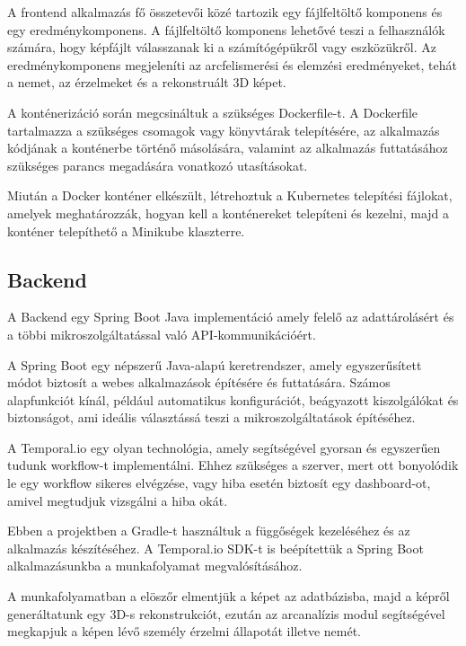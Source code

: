 \documentclass[12pt,a4]{article}
\begin{document}
            A frontend alkalmazás fő összetevői közé tartozik egy fájlfeltöltő komponens és egy eredménykomponens. A fájlfeltöltő komponens lehetővé teszi a felhasználók számára, hogy képfájlt válasszanak ki a számítógépükről vagy eszközükről. Az eredménykomponens megjeleníti az arcfelismerési és elemzési eredményeket, tehát a nemet, az érzelmeket és a rekonstruált 3D képet.

            A konténerizáció során megcsináltuk a szükséges Dockerfile-t. A Dockerfile tartalmazza a szükséges csomagok vagy könyvtárak telepítésére, az alkalmazás kódjának a konténerbe történő másolására, valamint az alkalmazás futtatásához szükséges parancs megadására vonatkozó utasításokat. 

            Miután a Docker konténer elkészült, létrehoztuk a Kubernetes telepítési fájlokat, amelyek meghatározzák, hogyan kell a konténereket telepíteni és kezelni, majd a konténer telepíthető a Minikube klaszterre.
            
        \subsection{Backend}

            A Backend egy Spring Boot Java implementáció amely felelő az adattárolásért és a többi mikroszolgáltatással való API-kommunikációért.

            A Spring Boot egy népszerű Java-alapú keretrendszer, amely egyszerűsített módot biztosít a webes alkalmazások építésére és futtatására. Számos alapfunkciót kínál, például automatikus konfigurációt, beágyazott kiszolgálókat és biztonságot, ami ideális választássá teszi a mikroszolgáltatások építéséhez.
            
            A Temporal.io egy olyan technológia, amely segítségével gyorsan és
        	egyszerűen tudunk workflow-t implementálni. Ehhez szükséges a szerver,
        	mert ott bonyolódik le egy workflow sikeres elvégzése, vagy hiba esetén
        	biztosít egy dashboard-ot, amivel megtudjuk vizsgálni a hiba okát. 

            Ebben a projektben a Gradle-t használtuk a függőségek kezeléséhez és az alkalmazás készítéséhez. A Temporal.io SDK-t is beépítettük a Spring Boot alkalmazásunkba a munkafolyamat megvalósításához.

            A munkafolyamatban a elöszőr elmentjük a képet az adatbázisba, majd a képről generáltatunk egy 3D-s rekonstrukciót, ezután az arcanalízis modul segítségével megkapjuk a képen lévő személy érzelmi állapotát illetve nemét.
\end{document}
